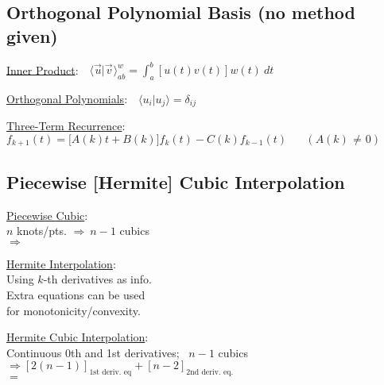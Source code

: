 \documentclass[12pt]{article}
\newcommand{\hs}{\hspace{1pt}}
\newcommand{\hsvec}[1]{\vec{\hs #1}}
\begin{document}
\vspace{5pt}
\subsection{Orthogonal Polynomial Basis (no method given)}

\vspace{10pt}
\parbox[t]{.55\textwidth}{%
    \underline{Inner Product}:\ \ \(
        \boxed{
            \langle \hsvec{u} | \hsvec{v} \hs \rangle_{ab}^w 
            = \int_a^b \left[ u(t) v(t) \right] w(t) \ dt 
        }
    \)
}
\parbox[t]{.44\textwidth}{%
    \underline{Orthogonal Polynomials}:\ \ \(
        \boxed{
            \langle u_i | u_j \rangle
            = \delta_{ij}
        }
    \)
}

\vspace{5pt}
\underline{Three-Term Recurrence}: \ \ \(
    \boxed{ f_{k+1}(t) = \big[ A(k)t + B(k) \big] f_k(t) - C(k) f_{k-1}(t) } 
    \hspace{20pt} {\scriptstyle(A(k) \hs \neq\hs 0)}
\)

\subsection{Piecewise [Hermite] Cubic Interpolation}

\parbox[t]{5cm}{
    \underline{Piecewise Cubic}: \\[5pt]
    {\scriptsize 
        \(n\) knots/pts. \(\Rightarrow\ n-1\) cubics \\
        \(\Rightarrow\)  
    }
}
\parbox[t]{5cm}{
    \underline{Hermite Interpolation}: \\[5pt]
    {\scriptsize 
        Using \(k\)-th derivatives as info.\\
        Extra equations can be used \\
        for monotonicity/convexity.
    }
}
\parbox[t]{7cm}{
    \underline{Hermite Cubic Interpolation}: \\[5pt] 
    {\scriptsize 
        Continuous 0th and 1st derivatives; \ \(n-1\) cubics \\
        \(\Rightarrow [2(n-1)]_\text{1st deriv. eq} + [n-2]_\text{2nd deriv. eq.}\) \\
        \(=\) 
    }
}
\end{document}
